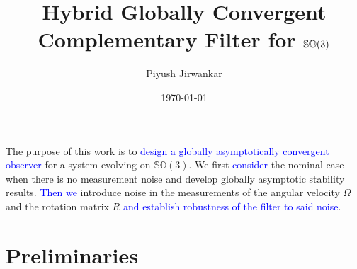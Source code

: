 \documentclass{article}
\title{Hybrid Globally Convergent Complementary Filter for $\SOthree$}
\author{Piyush Jirwankar}
\date{\today}
\newcommand{\SOthree}{\mathbb{SO}(3)}
\newcommand{\textblue}[1]{\textcolor{blue}{#1}}
\begin{document}
\maketitle

The purpose of this work is to \textblue{design a globally asymptotically convergent observer} for a system evolving on $\SOthree$. We first \textblue{consider} the nominal case when there is no measurement noise and develop globally asymptotic stability results. \textblue{Then we} introduce noise in the measurements of the angular velocity $\Omega$ and the rotation matrix $R$ \textblue{and establish robustness of the filter to said noise}. 

\section{Preliminaries}
\end{document}
